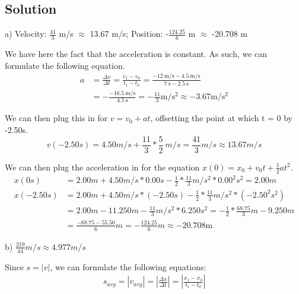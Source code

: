 \documentclass[12pt]{article}
\begin{document}
\subsection*{Solution}

a) Velocity: $\frac{41}{3}$ \unit{\m/\s} $\approx$ 13.67 \unit{\m/\s}; Position: -$\frac{124.25}{6}$ \unit{m} $\approx$ -20.708 \unit{\m}

We have here the fact that the acceleration is constant. As such, we can formulate the following equation.
\begin{align*}
    a&= \frac{\Delta v}{\Delta t} = \frac{v_1 - v_0}{t_1 - t_0} 
      = \frac{-12\ \unit{\m/\s} - 4.5\ \unit{\m/\s}}{7\ \unit{\s} - 2.5\ \unit{\s}}\\
     &= -\frac{-16.5\ \unit{\m/\s}}{4.5\ \unit{\s}}
      = -\frac{11}{3} \unit{\m/\s^2} \approx -3.67 \unit{\m/\s^2}
\end{align*}

We can then plug this in for $v=v_0+at$, offsetting the point at which t = 0 by -2.50s.
\begin{equation*}
    v(-2.50\unit{s}) = 4.50\unit{m/s} + \frac{11}{3}*\frac{5}{2}\ \unit{m/s} = \boxed{\frac{41}{3}\unit{m/s} \approx 13.67\unit{m/s}}
\end{equation*}

We can then plug the acceleration in for the equation $x(0) = x_0 + v_0t + \frac{1}{2}at^2$.
\begin{align*}
    x(0\unit{s}) &= 2.00 \unit{m} + 4.50\unit{m/s}*0.00\unit{s} - \frac{1}{2}*\frac{11}{3}\unit{m/s^2}*0.00^2\unit{s}^2 = 2.00 \unit{m}\\
    x(-2.50\unit{s}) &= 2.00 \unit{m} + 4.50\unit{m/s}*(-2.50\unit{s}) - \frac{1}{2}*\frac{11}{3}\unit{m/s^2}*(-2.50^2\unit{s}^2) \\
        &= 2.00 \unit{m} - 11.250\unit{m} - \frac{11}{3}\unit{m/s^2}*6.250\unit{s}^2 = -\frac{1}{2}*\frac{68.75}{3}\unit{m} - 9.250 \unit{m}\\
        &= \frac{-68.75 - 55.50}{6}\unit{m} = \boxed{ -\frac{124.25}{6} \unit{m} \approx -20.708 \unit{\m} }
\end{align*}

\pagebreak
b) $\frac{219}{44} \unit{m/s} \approx 4.977\unit{m/s}$

Since $s = |v|$, we can formulate the following equations:
\begin{align*}
    s_{avg} = |v_{avg}| = \left| \frac{\Delta x}{\Delta t} \right| = \left| \frac{x_1 - x_0}{t_1 - t_0} \right|
\end{align*}
\end{document}
